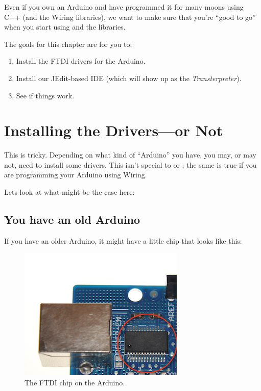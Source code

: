 Even if you own an Arduino and have programmed it for many moons using C++ (and the Wiring libraries), we want to make sure that you're ``good to go'' when you start using \occam and the \plumbing libraries. 

\GOALS
The goals for this chapter are for you to:

\begin{enumerate}
	\item Install the FTDI drivers for the Arduino.
	\item Install our JEdit-based IDE (which will show up as the {\em Transterpreter}).
	\item See if things work.
\end{enumerate}

\section{Installing the Drivers---or Not}
This is tricky. Depending on what kind of ``Arduino'' you have, you may, or may not, need to install some drivers. This isn't special to \occam or \plumbing; the same is true if you are programming your Arduino using Wiring.

Lets look at what might be the case here:

\subsection{You have an old Arduino}
If you have an older Arduino, it might have a little chip that looks like this:

\begin{figure}[ht]
  \begin{center}
    \includegraphics[width=0.8\linewidth]{images/20110115-ftdi-chip}
    \caption{The FTDI chip on the Arduino.}
    \label{image:ftdi-chip}
  \end{center}
\end{figure}

